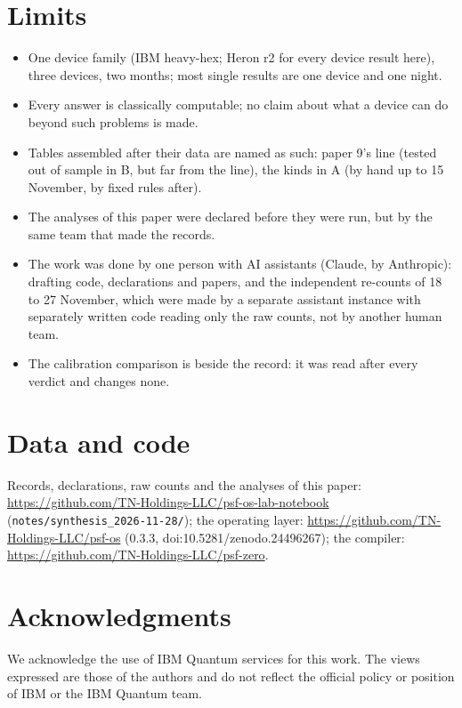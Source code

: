 \documentclass[10pt,a4paper]{article}
\begin{document}
\section{Limits}\label{sec:limits}
\begin{itemize}
\item One device family (IBM heavy-hex; Heron r2 for every device result here), three devices, two months; most single
results are one device and one night.
\item Every answer is classically computable; no claim about what a device can do beyond such problems is made.
\item Tables assembled after their data are named as such: paper 9's line (tested out of sample in B, but far from the
line), the kinds in A (by hand up to 15 November, by fixed rules after).
\item The analyses of this paper were declared before they were run, but by the same team that made the records.
\item The work was done by one person with AI assistants (Claude, by Anthropic): drafting code, declarations and
papers, and the independent re-counts of 18 to 27 November, which were made by a separate assistant instance with
separately written code reading only the raw counts, not by another human team.
\item The calibration comparison is beside the record: it was read after every verdict and changes none.
\end{itemize}

\section*{Data and code}
Records, declarations, raw counts and the analyses of this paper: \url{https://github.com/TN-Holdings-LLC/psf-os-lab-notebook}
(\texttt{notes/synthesis\_2026-11-28/}); the operating layer: \url{https://github.com/TN-Holdings-LLC/psf-os}
(0.3.3, doi:10.5281/zenodo.24496267); the compiler: \url{https://github.com/TN-Holdings-LLC/psf-zero}.

\section*{Acknowledgments}
We acknowledge the use of IBM Quantum services for this work. The views expressed are those of the authors and do not
reflect the official policy or position of IBM or the IBM Quantum team.
\end{document}
